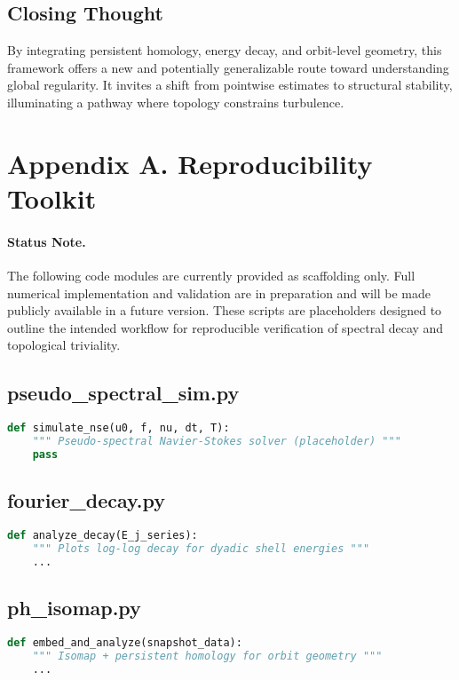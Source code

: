 \documentclass[11pt]{article}
\theoremstyle{definition}
\begin{document}
\subsection*{Closing Thought}
By integrating persistent homology, energy decay, and orbit-level geometry, this framework offers a new and potentially generalizable route toward understanding global regularity. It invites a shift from pointwise estimates to structural stability, illuminating a pathway where topology constrains turbulence.



\section{Appendix A. Reproducibility Toolkit}
\label{sec:appendixA}

\paragraph{Status Note.}
The following code modules are currently provided as scaffolding only. Full numerical implementation and validation are in preparation and will be made publicly available in a future version. These scripts are placeholders designed to outline the intended workflow for reproducible verification of spectral decay and topological triviality.

\subsection*{pseudo\_spectral\_sim.py}
\begin{lstlisting}[language=Python]
def simulate_nse(u0, f, nu, dt, T):
    """ Pseudo-spectral Navier-Stokes solver (placeholder) """
    pass
\end{lstlisting}

\subsection*{fourier\_decay.py}
\begin{lstlisting}[language=Python]
def analyze_decay(E_j_series):
    """ Plots log-log decay for dyadic shell energies """
    ...
\end{lstlisting}

\subsection*{ph\_isomap.py}
\begin{lstlisting}[language=Python]
def embed_and_analyze(snapshot_data):
    """ Isomap + persistent homology for orbit geometry """
    ...
\end{lstlisting}
\end{document}
